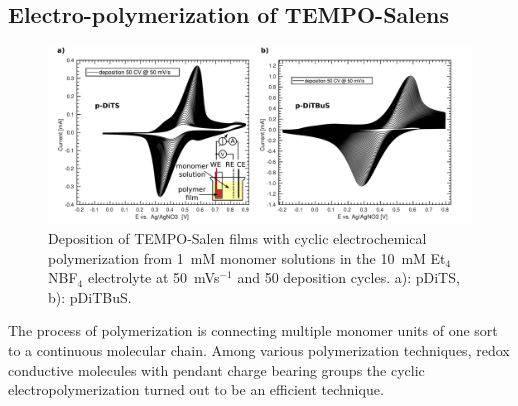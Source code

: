 \subsection{Electro-polymerization of TEMPO-Salens}
\begin{figure}[!ht]
\center
	\includegraphics[width=1\textwidth]{./electrochemistry/figures/DITBUS_DEPO.pdf}
	\caption{Deposition of TEMPO-Salen films with cyclic electrochemical polymerization from 1~mM monomer solutions in the 10~mM Et$_4$NBF$_4$ electrolyte at 50~mVs$^{-1}$ and 50 deposition cycles. a): pDiTS, b): pDiTBuS.}
	\label{fig:DITBUS_DEPO}
\end{figure}

The process of polymerization is connecting multiple monomer units of one sort to a continuous molecular chain. Among various polymerization techniques, redox conductive molecules with pendant charge bearing groups the cyclic electropolymerization turned out to be an efficient technique. \\




